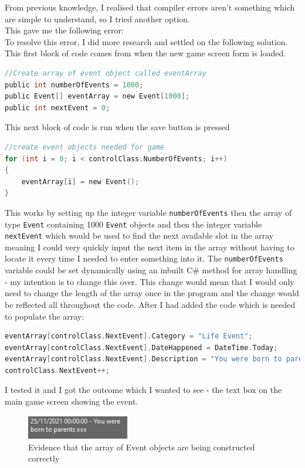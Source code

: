 From previous knowledge, I realised that compiler errors aren't something which are simple to understand, so I tried another option.\\
This gave me the following error:
\\
To resolve this error, I did more research and settled on the following solution.\\
This first block of code comes from when the new game screen form is loaded.
\begin{lstlisting}[language=c, style=csharp, caption=Final solution for declaring an array of objects part 1]
//Create array of event object called eventArray
public int numberOfEvents = 1000;
public Event[] eventArray = new Event[1000];
public int nextEvent = 0;
\end{lstlisting}
This next block of code is run when the save button is pressed
\begin{lstlisting}[language=c, style=csharp, caption=Final solution for declaring an array of objects part 2]
//create event objects needed for game
for (int i = 0; i < controlClass.NumberOfEvents; i++)
{
    eventArray[i] = new Event();
}
\end{lstlisting}
This works by setting up the integer variable \verb|numberOfEvents| then the array of type \verb|Event| containing 1000 \verb|Event| objects and then the integer variable \verb|nextEvent| which would be used to find the next available slot in the array meaning I could very quickly input the next item in the array without having to locate it every time I needed to enter something into it. The \verb|numberOfEvents| variable could be set dynamically using an inbuilt C\# method for array handling - my intention is to change this over. This change would mean that I would only need to change the length of the array once in the program and the change would be reflected all throughout the code.
After I had added the code which is needed to populate the array:
\begin{lstlisting}[language=c, style=csharp, caption=Code needed to create the first event in the array]
eventArray[controlClass.NextEvent].Category = "Life Event";
eventArray[controlClass.NextEvent].DateHappened = DateTime.Today;
eventArray[controlClass.NextEvent].Description = "You were born to parents xxx;
controlClass.NextEvent++;
\end{lstlisting}
I tested it and I got the outcome which I wanted to see - the text box on the main game screen showing the event.
\begin{figure}[H]
    \centering
    \includegraphics[width=0.4\textwidth]{images/implementation/eventArrayDemo.png}
    \caption{Evidence that the array of Event objects are being constructed correctly}
    \label{fig:implementation-eventArrayDemo}
\end{figure}

